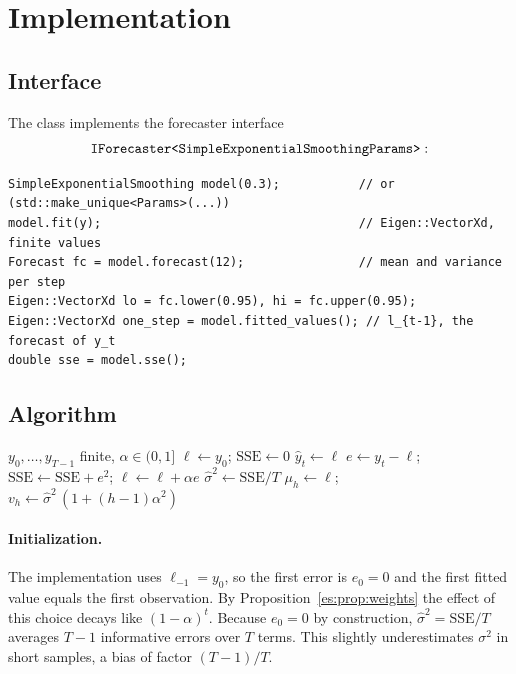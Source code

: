 \section{Implementation}

\subsection{Interface}
The class implements the forecaster interface
\[
  \texttt{IForecaster<SimpleExponentialSmoothingParams>}:
\]
\begin{lstlisting}
SimpleExponentialSmoothing model(0.3);           // or (std::make_unique<Params>(...))
model.fit(y);                                    // Eigen::VectorXd, finite values
Forecast fc = model.forecast(12);                // mean and variance per step
Eigen::VectorXd lo = fc.lower(0.95), hi = fc.upper(0.95);
Eigen::VectorXd one_step = model.fitted_values(); // l_{t-1}, the forecast of y_t
double sse = model.sse();
\end{lstlisting}

\subsection{Algorithm}
\begin{algorithm}[ht]
\caption{SES fit and forecast}\label{es:alg:ses}
\begin{algorithmic}[1]
\Require $y_0,\dots,y_{T-1}$ finite, $\alpha\in(0,1]$
\State $\ell\gets y_0$;\; $\mathrm{SSE}\gets0$ 
  \State $\hat y_t\gets\ell$ 
  \State $e\gets y_t-\ell$;\; $\mathrm{SSE}\gets\mathrm{SSE}+e^2$;\; $\ell\gets\ell+\alpha e$
\EndFor
\State $\hat\sigma^2\gets\mathrm{SSE}/T$
 
  \State $\mu_h\gets\ell$;\; $v_h\gets\hat\sigma^2\,(1+(h-1)\alpha^2)$
\EndFor
\end{algorithmic}
\end{algorithm}

\paragraph{Initialization.}
The implementation uses $\ell_{-1}=y_0$, so the first error is $e_0=0$ and the
first fitted value equals the first observation. By
Proposition~\ref{es:prop:weights} the effect of this choice decays like
$(1-\alpha)^{t}$. Because $e_0=0$ by construction, $\hat\sigma^2=\mathrm{SSE}/T$
averages $T-1$ informative errors over $T$ terms. This slightly
underestimates $\sigma^2$ in short samples, a bias of factor $(T-1)/T$.

